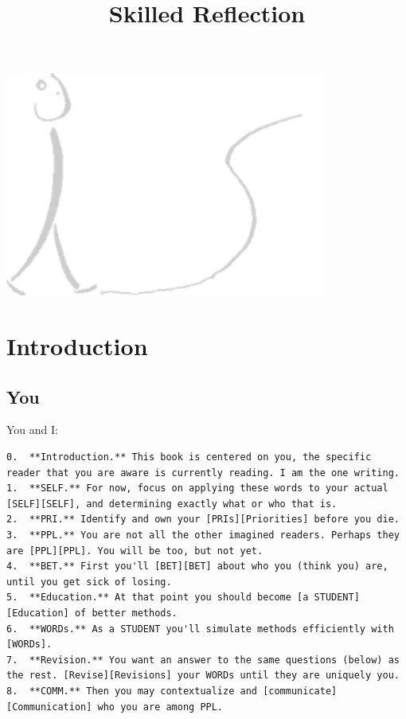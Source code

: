 \documentclass[
]{book}
\title{Skilled Reflection}
\author{}
\date{\vspace{-2.5em}}
\begin{document}
\maketitle

{
\setcounter{tocdepth}{1}
\tableofcontents
}
\begin{center}\includegraphics[width=4.17in]{figs/sr_gray_transp} \end{center}

\chapter*{Introduction}\label{introduction}

\section{You}\label{you}

You and I:

\begin{verbatim}
0.  **Introduction.** This book is centered on you, the specific reader that you are aware is currently reading. I am the one writing.
1.  **SELF.** For now, focus on applying these words to your actual [SELF][SELF], and determining exactly what or who that is.
2.  **PRI.** Identify and own your [PRIs][Priorities] before you die.
3.  **PPL.** You are not all the other imagined readers. Perhaps they are [PPL][PPL]. You will be too, but not yet.
4.  **BET.** First you'll [BET][BET] about who you (think you) are, until you get sick of losing.
5.  **Education.** At that point you should become [a STUDENT][Education] of better methods.
6.  **WORDs.** As a STUDENT you'll simulate methods efficiently with [WORDs].
7.  **Revision.** You want an answer to the same questions (below) as the rest. [Revise][Revisions] your WORDs until they are uniquely you.
8.  **COMM.** Then you may contextualize and [communicate][Communication] who you are among PPL.  
\end{verbatim}
\end{document}
